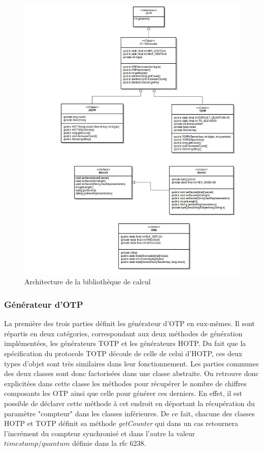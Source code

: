 \begin{figure}
  \centering
  \includegraphics[scale=0.4]{../graphics/uml_lib.jpg}
  \caption{Architecture de la bibliothèque de calcul}
  \label{fig:umlLib}
\end{figure}

\subsubsection{Générateur d'OTP}
La première des trois parties définit les générateur d'OTP en eux-mêmes. Il sont répartis en
deux catégories, correspondant aux deux méthodes de génération implémentées, les générateurs
TOTP et les générateurs HOTP. Du fait que la spécification du protocole TOTP découle de celle
de celui d'HOTP, ces deux types d'objet sont très similaires dans leur fonctionnement. Les
parties communes des deux classes sont donc factorisées dans une classe abstraite. On
retrouve donc explicitées dans cette classe les méthodes pour récupérer le nombre de chiffres
composants les OTP ainsi que celle pour générer ces derniers. En effet, il est possible de
déclarer cette méthode à cet endroit en déportant la récupération du paramètre "compteur"
dans les classes inférieures. De ce fait, chacune des classes HOTP et TOTP définit sa
méthode \emph{getCounter} qui dans un cas retournera l'incrément du compteur synchronisé et
dans l'autre la valeur $ timestamp / quantum $ définie dans la rfc 6238\cite{TOTP}.

